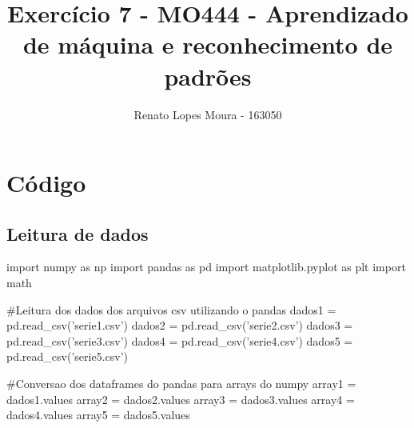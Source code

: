 \documentclass{article}
\title{Exercício 7 - MO444 - Aprendizado de máquina e reconhecimento de padrões}
\date{}
\author{Renato Lopes Moura - 163050}
\begin{document}
\maketitle

\section{Código}
\subsection{Leitura de dados}
%
\begin{tcolorbox}
\begin{python}
import numpy as np
import pandas as pd
import matplotlib.pyplot as plt 
import math

#Leitura dos dados dos arquivos csv utilizando o pandas
dados1 = pd.read_csv('serie1.csv')
dados2 = pd.read_csv('serie2.csv')
dados3 = pd.read_csv('serie3.csv')
dados4 = pd.read_csv('serie4.csv')
dados5 = pd.read_csv('serie5.csv')

#Conversao dos dataframes do pandas para arrays do numpy
array1 = dados1.values
array2 = dados2.values
array3 = dados3.values
array4 = dados4.values
array5 = dados5.values
\end{python}
\end{tcolorbox}

\newpage
\end{document}

